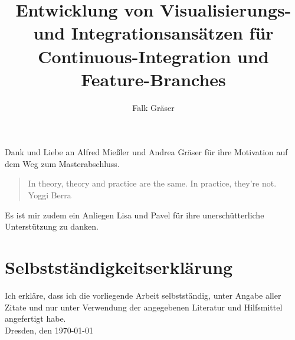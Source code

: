 \documentclass[12pt,a4paper]{book}
\author{Falk Gräser}
\title{Entwicklung von Visualisierungs- und Integrationsansätzen für Continuous-Integration und Feature-Branches}
\begin{document}
\frontmatter

\maketitle
\cleardoublepage

\begin{center}
	\vspace*{5cm}
	Dank und Liebe an Alfred Mießler und Andrea Gräser für ihre Motivation auf dem Weg zum Masterabschluss.
	\vspace*{1cm}
	\blockquote {\centering In theory, theory and practice are the same. In practice, they’re not. \\Yoggi Berra}
	\vfill
	Es ist mir zudem ein Anliegen Lisa und Pavel für ihre unerschütterliche Unterstützung zu danken.
\end{center}

\tableofcontents

\listoffigures
\printglossary

\mainmatter








\appendix
\printbibliography[heading=bibnumbered]
\chapter{Selbstständigkeitserklärung}
Ich erkläre, dass ich die vorliegende Arbeit selbstständig, unter Angabe aller Zitate und nur unter Verwendung der angegebenen Literatur und Hilfsmittel angefertigt habe.
\vspace{5em}
\\
Dresden, den \today
\end{document}
